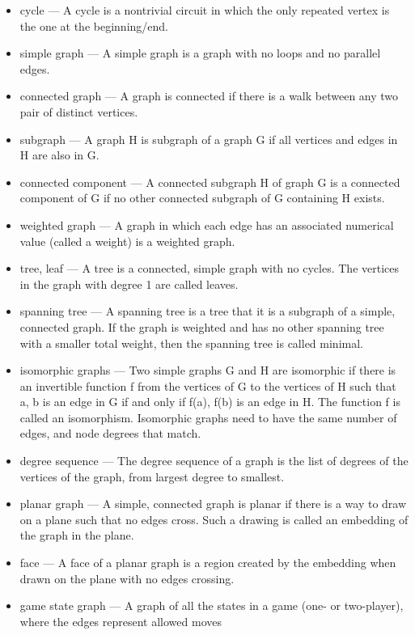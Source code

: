 \documentclass[8pt]{article}
\begin{document}
\begin{paracol}{3}
\begin{itemize}[noitemsep]
            \item  cycle — A cycle is a nontrivial circuit in which the only repeated vertex is the one at the beginning/end.
            \item  simple graph — A simple graph is a graph with no loops and no parallel edges.
            \item  connected graph — A graph is connected if there is a walk between any two pair of distinct vertices.
            \item subgraph — A graph H is subgraph of a graph G if all vertices and edges in H are also in G.
            \item  connected component — A connected subgraph H of graph G is a connected component of G if no other connected subgraph of G containing H exists.
            \item  weighted graph — A graph in which each edge has an associated numerical value (called a weight) is a weighted graph.
            \item  tree, leaf — A tree is a connected, simple graph with no cycles. The vertices in the graph with degree 1 are called leaves.
            \item  spanning tree — A spanning tree is a tree that it is a subgraph of a simple, connected graph. If the graph is weighted and has no other spanning tree with a smaller total weight, then the spanning tree is called minimal.
            \item  isomorphic graphs — Two simple graphs G and H are isomorphic if there is an invertible function f from the vertices of G to the vertices of H such that {a, b} is an edge in G if and only if {f(a), f(b)} is an edge in H. The function f is called an isomorphism. Isomorphic graphs need to have the same number of edges, and node degrees that match.
            \item  degree sequence — The degree sequence of a graph is the list of degrees of the vertices of the graph, from largest degree to smallest.
            \item  planar graph — A simple, connected graph is planar if there is a way to draw on a plane such that no edges cross. Such a drawing is called an embedding of the graph in the plane.
            \item  face — A face of a planar graph is a region created by the embedding when drawn on the plane with no edges crossing.
            \item  game state graph — A graph of all the states in a game (one- or two-player), where the edges represent allowed moves

\end{itemize}
\end{paracol}
\end{document}
